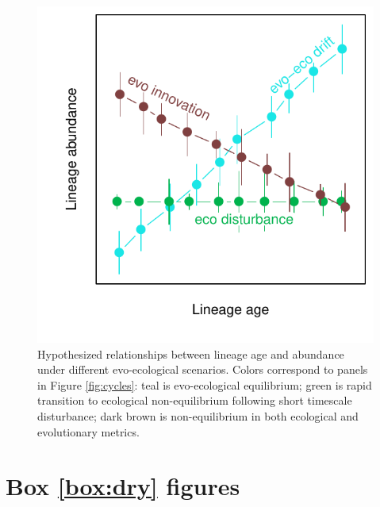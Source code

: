 \documentclass[12pt]{article}
\newcounter{Box}
\begin{document}
\begin{figure}[!hbp]
  \centering
  \includegraphics[scale=1]{fig_age-abund.pdf}
  \caption{Hypothesized relationships between lineage age and
    abundance under different evo-ecological scenarios. Colors
    correspond to panels in Figure \ref{fig:cycles}: teal is
    evo-ecological equilibrium; green is rapid transition to
    ecological non-equilibrium following short timescale disturbance;
    dark brown is non-equilibrium in both ecological and evolutionary
    metrics.}
  \label{fig:age-abund}
\end{figure}

\pagebreak

\section*{Box \ref{box:dry} figures}

\setcounter{figure}{0}
\renewcommand{\thefigure}{\Roman{figure}}
\end{document}

